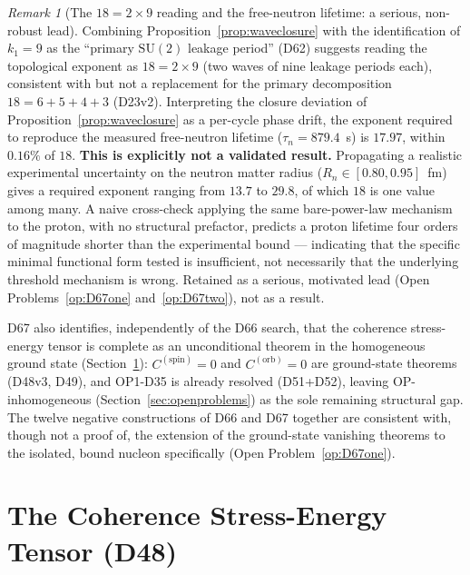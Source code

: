 \documentclass[11pt,a4paper]{article}
\theoremstyle{plain}
\theoremstyle{definition}
\theoremstyle{remark}
\newtheorem{remark}[theorem]{Remark}
\begin{document}
\begin{remark}[The $18=2\times9$ reading and the free-neutron lifetime: a serious, non-robust lead]
\label{rem:D67exponent}
Combining Proposition~\ref{prop:waveclosure} with the identification of $k_1=9$ as the ``primary $\mathrm{SU}(2)$ leakage period'' (D62) suggests reading the topological exponent as $18=2\times9$ (two waves of nine leakage periods each), consistent with but not a replacement for the primary decomposition $18=6+5+4+3$ (D23v2). Interpreting the closure deviation of Proposition~\ref{prop:waveclosure} as a per-cycle phase drift, the exponent required to reproduce the measured free-neutron lifetime ($\tau_n=879.4$~s) is $17.97$, within $0.16\%$ of $18$. \textbf{This is explicitly not a validated result.} Propagating a realistic experimental uncertainty on the neutron matter radius ($R_n\in[0.80,0.95]$~fm) gives a required exponent ranging from $13.7$ to $29.8$, of which $18$ is one value among many. A naive cross-check applying the same bare-power-law mechanism to the proton, with no structural prefactor, predicts a proton lifetime four orders of magnitude shorter than the experimental bound --- indicating that the specific minimal functional form tested is insufficient, not necessarily that the underlying threshold mechanism is wrong. Retained as a serious, motivated lead (Open Problems~\ref{op:D67one} and~\ref{op:D67two}), not as a result.
\end{remark}

D67 also identifies, independently of the D66 search, that the coherence stress-energy tensor is complete as an unconditional theorem in the homogeneous ground state (Section~\ref{sec:Ccoh}): $C^{(\mathrm{spin})}=0$ and $C^{(\mathrm{orb})}=0$ are ground-state theorems (D48v3, D49), and OP1-D35 is already resolved (D51+D52), leaving OP-inhomogeneous (Section~\ref{sec:openproblems}) as the sole remaining structural gap. The twelve negative constructions of D66 and D67 together are consistent with, though not a proof of, the extension of the ground-state vanishing theorems to the isolated, bound nucleon specifically (Open Problem~\ref{op:D67one}).

\section{The Coherence Stress-Energy Tensor (D48)}
\label{sec:Ccoh}
\end{document}

